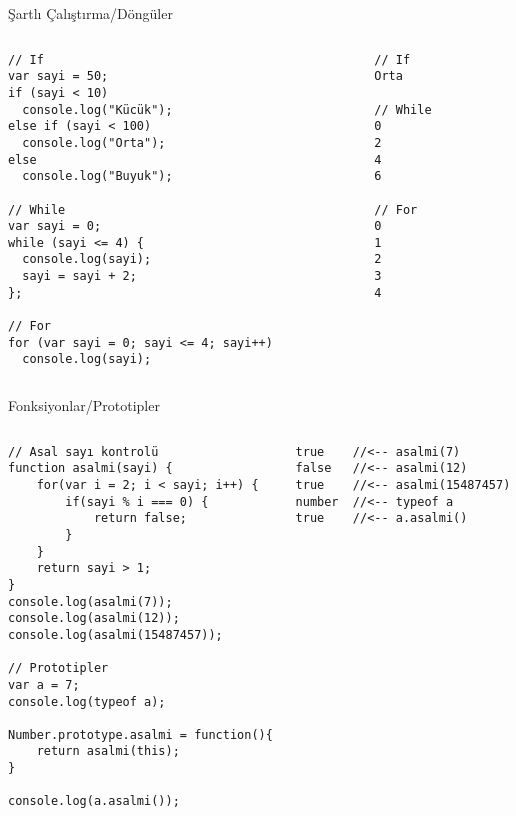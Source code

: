 \documentclass[xcolor=dvipsnames]{beamer}
\begin{document}
\begin{frame}[fragile]{Şartlı Çalıştırma/Döngüler}
\begin{columns}[T] %

\begin{column}{.68\textwidth}
\centering
\begin{verbatim}
// If
var sayi = 50;
if (sayi < 10)
  console.log("Kücük");
else if (sayi < 100)
  console.log("Orta");
else
  console.log("Buyuk");

// While
var sayi = 0;
while (sayi <= 4) {
  console.log(sayi);
  sayi = sayi + 2;
};

// For
for (var sayi = 0; sayi <= 4; sayi++)
  console.log(sayi);
\end{verbatim}
\end{column}%

\begin{column}{.28\textwidth}
\begin{verbatim}
// If
Orta

// While
0
2
4
6

// For
0
1
2
3
4
\end{verbatim}
\end{column}%

\end{columns}
\end{frame}
\begin{frame}[fragile]{Fonksiyonlar/Prototipler}
\begin{columns}[T] %

\begin{column}{.58\textwidth}
\centering
\begin{verbatim}
// Asal sayı kontrolü
function asalmi(sayi) {
    for(var i = 2; i < sayi; i++) {
        if(sayi % i === 0) {
            return false;
        }
    }
    return sayi > 1;
}
console.log(asalmi(7));
console.log(asalmi(12));
console.log(asalmi(15487457));

// Prototipler
var a = 7;
console.log(typeof a);

Number.prototype.asalmi = function(){
    return asalmi(this);
}

console.log(a.asalmi());
\end{verbatim}
\end{column}%

\begin{column}{.38\textwidth}
\begin{verbatim}
true    //<-- asalmi(7)
false   //<-- asalmi(12)
true    //<-- asalmi(15487457)
number  //<-- typeof a
true    //<-- a.asalmi()
\end{verbatim}
\end{column}%

\end{columns}
\end{frame}
\end{document}
